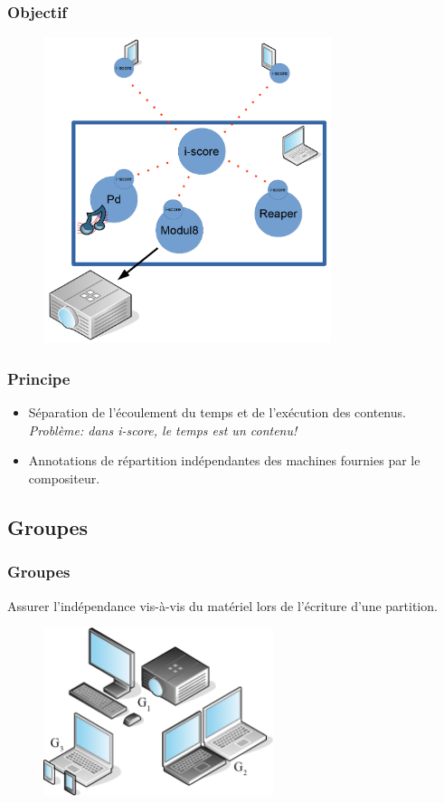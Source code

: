 \documentclass[handout]{beamer}
\begin{document}
\begin{frame}
\frametitle{Objectif}
\Large
\begin{figure}
    \vspace{-1cm}
    \includegraphics[width=0.75\textwidth]{draw/objective.png}
\end{figure}

\end{frame}

\begin{frame}
\frametitle{Principe}
\Large
\begin{itemize}
    \item Séparation de l'écoulement du temps et de l'exécution des contenus.
    ~\\ { \normalsize \textit{Problème: dans i-score, le temps est un contenu!} }
    \item Annotations de répartition indépendantes des machines fournies par le compositeur.
\end{itemize}
\end{frame}

\subsection{Groupes}
\begin{frame}
\frametitle{Groupes}
{\Large Assurer l'indépendance vis-à-vis du matériel lors de l'écriture d'une partition.}
\begin{figure}
	\centering
	\includegraphics[width=0.6\textwidth]{images/groupes.eps}
\end{figure}
\end{frame}
\end{document}
